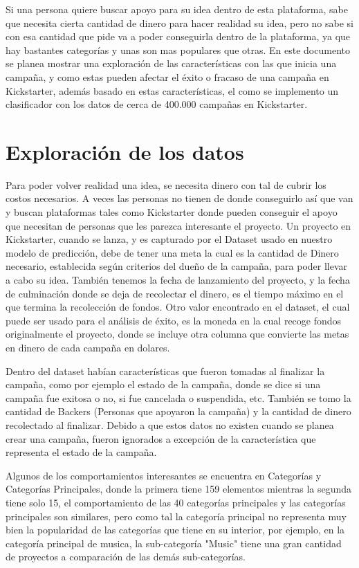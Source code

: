 \documentclass[journal]{IEEEtran}
\begin{document}
Si una persona quiere buscar apoyo para su idea dentro de esta plataforma, sabe que necesita cierta cantidad de dinero para hacer realidad su idea, pero no sabe si con esa cantidad que pide va a poder conseguirla dentro de la plataforma, ya que hay bastantes categorías y unas son mas populares que otras. En este documento se planea mostrar una exploración de las características con las que inicia una campaña, y como estas pueden afectar el éxito o fracaso de una campaña en Kickstarter, además basado en estas características, el como se implemento un clasificador con los datos de cerca de 400.000 campañas en Kickstarter. 

\section{Exploración de los datos}
Para poder volver realidad una idea, se necesita dinero con tal de cubrir los costos necesarios. A veces las personas no tienen de donde conseguirlo así que van y buscan plataformas tales como Kickstarter donde pueden conseguir el apoyo que necesitan de personas que les parezca interesante el proyecto. Un proyecto en Kickstarter, cuando se lanza, y es capturado por el Dataset usado en nuestro modelo de predicción, debe de tener una meta la cual es la cantidad de Dinero necesario, establecida según criterios del dueño de la campaña, para poder llevar a cabo su idea. También tenemos la fecha de lanzamiento del proyecto, y la fecha de culminación donde se deja de recolectar el dinero, es el tiempo máximo en el que termina la recolección de fondos. Otro valor encontrado en el dataset, el cual puede ser usado para el análisis de  éxito, es la moneda en la cual recoge fondos originalmente el proyecto, donde se incluye otra columna que convierte las metas en dinero de cada campaña en dolares.

Dentro del dataset habían características que fueron tomadas al finalizar la campaña, como por ejemplo el estado de la campaña, donde se dice si una campaña fue exitosa o no, si fue cancelada o suspendida, etc. También se tomo la cantidad de Backers (Personas que apoyaron la campaña) y la cantidad de dinero recolectado al finalizar. Debido a que estos datos no existen cuando se planea crear una campaña, fueron ignorados a excepción de la característica que representa el estado de la campaña.

Algunos de los comportamientos interesantes se encuentra en Categorías y Categorías Principales, donde la primera tiene 159 elementos mientras la segunda tiene solo 15, el comportamiento de las 40 categorías principales y las categorías principales son similares, pero como tal la categoría principal no representa muy bien la popularidad de las categorías que tiene en su interior, por ejemplo, en la categoría principal de musica, la sub-categoría "Music" tiene una gran cantidad de proyectos a comparación de las demás sub-categorías.
\end{document}

